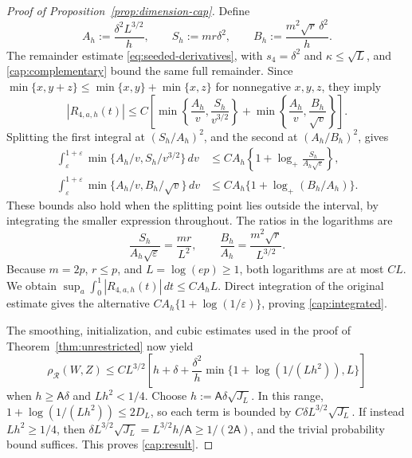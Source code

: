 \documentclass[11pt,letterpaper]{article}
\newcommand{\vSix}[1]{{\color{magenta}#1}}
\theoremstyle{remark}
\newcommand{\rh}{\rho_{\mathcal R}}
\begin{document}
\begin{proof}[Proof of Proposition~\ref{prop:dimension-cap}]
Define
\[
 A_h:=\frac{\delta^2L^{3/2}}h,\qquad
 S_h:=mr\delta^2,\qquad
 B_h:=\frac{m^2\sqrt r\,\delta^2}h.
\]
\vSix{The remainder estimate \eqref{eq:seeded-derivatives}, with
\(s_4=\delta^2\) and \(\kappa\le\sqrt L\), and
\eqref{cap:complementary} bound the same}
full remainder. Since \(\min\{x,y+z\}\le
\min\{x,y\}+\min\{x,z\}\) for nonnegative \(x,y,z\), they imply
\[
 |R_{4,a,h}(t)|\le C\left[
 \min\left\{\frac{A_h}v,\frac{S_h}{v^{3/2}}\right\}
 +\min\left\{\frac{A_h}v,\frac{B_h}{\sqrt v}\right\}\right].
\]
Splitting the first integral at \((S_h/A_h)^2\), and the second
at \((A_h/B_h)^2\), gives
\begin{align*}
 \int_\varepsilon^{1+\varepsilon}
       \min\{A_h/v,S_h/v^{3/2}\}\,dv
 &\le CA_h\left\{1+\log_+
                    \frac{S_h}{A_h\sqrt\varepsilon}\right\},\\
 \int_\varepsilon^{1+\varepsilon}
       \min\{A_h/v,B_h/\sqrt v\}\,dv
 &\le CA_h\{1+\log_+(B_h/A_h)\}.
\end{align*}
These bounds also hold when the splitting point lies outside the
interval, by integrating the smaller expression throughout.
The ratios in the logarithms are
\[
 \frac{S_h}{A_h\sqrt\varepsilon}=\frac{mr}{L^2},
 \qquad \frac{B_h}{A_h}=\frac{m^2\sqrt r}{L^{3/2}}.
\]
Because \(m=2p\), \(r\le p\), and \(L=\log(ep)\ge1\), both
logarithms are at most \(CL\). We obtain
\(\sup_a\int_0^1|R_{4,a,h}(t)|\,dt\le CA_hL\).
Direct integration of the original estimate gives the alternative
\(CA_h\{1+\log(1/\varepsilon)\}\), proving
\eqref{cap:integrated}.

The smoothing, initialization, and cubic estimates used in the
proof of Theorem~\ref{thm:unrestricted} now yield
\[
 \rh(W,Z)\le CL^{3/2}\left[
 h+\delta+\frac{\delta^2}h
       \min\{1+\log(1/(Lh^2)),L\}\right]
\]
when \(h\ge\mathsf A\delta\) and \(Lh^2<1/4\). Choose
\(h:=\mathsf A\delta\sqrt{J_L}\). In this range,
\(1+\log(1/(Lh^2))\le2D_L\), so each term is bounded by
\(C\delta L^{3/2}\sqrt{J_L}\).
If instead \(Lh^2\ge1/4\), then
\(\delta L^{3/2}\sqrt{J_L}=L^{3/2}h/\mathsf A
 \ge1/(2\mathsf A)\), and the trivial probability bound suffices.
This proves \eqref{cap:result}.
\end{proof}
\end{document}
